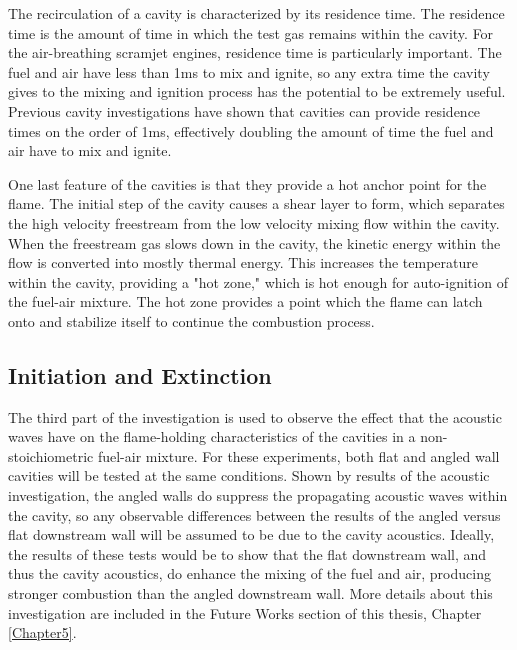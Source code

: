 The recirculation of a cavity is characterized by its residence time. The residence time is the amount of time in which the test gas remains within the cavity. For the air-breathing scramjet engines, residence time is particularly important. The fuel and air have less than 1ms to mix and ignite, so any extra time the cavity gives to the mixing and ignition process has the potential to be extremely useful. Previous cavity investigations have shown that cavities can provide residence times on the order of 1ms, effectively doubling the amount of time the fuel and air have to mix and ignite. 

One last feature of the cavities is that they provide a hot anchor point for the flame. The initial step of the cavity causes a shear layer to form, which separates the high velocity freestream from the low velocity mixing flow within the cavity. When the freestream gas slows down in the cavity, the kinetic energy within the flow is converted into mostly thermal energy. This increases the temperature within the cavity, providing a "hot zone," which is hot enough for auto-ignition of the fuel-air mixture. The hot zone provides a point which the flame can latch onto and stabilize itself to continue the combustion process. 



\subsection{Initiation and Extinction}

The third part of the investigation is used to observe the effect that the acoustic waves have on the flame-holding characteristics of the cavities in a non-stoichiometric fuel-air mixture. For these experiments, both flat and angled wall cavities will be tested at the same conditions. Shown by results of the acoustic investigation, the angled walls do suppress the propagating acoustic waves within the cavity, so any observable differences between the results of the angled versus flat downstream wall will be assumed to be due to the cavity acoustics. Ideally, the results of these tests would be to show that the flat downstream wall, and thus the cavity acoustics, do enhance the mixing of the fuel and air, producing stronger combustion than the angled downstream wall. More details about this investigation are included in the Future Works section of this thesis, Chapter \ref{Chapter5}.


